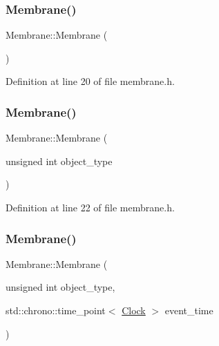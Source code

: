 \subsubsection{\texorpdfstring{Membrane()}{Membrane()}\hspace{0.1cm}{\footnotesize\ttfamily [1/4]}}
{\footnotesize\ttfamily Membrane\+::\+Membrane (\begin{DoxyParamCaption}{ }\end{DoxyParamCaption})\hspace{0.3cm}{\ttfamily [inline]}}



Definition at line 20 of file membrane.\+h.

\mbox{\label{class_membrane_a9e45fcb5a4e791f2697fce4d9fa78a3f}} 
\subsubsection{\texorpdfstring{Membrane()}{Membrane()}\hspace{0.1cm}{\footnotesize\ttfamily [2/4]}}
{\footnotesize\ttfamily Membrane\+::\+Membrane (\begin{DoxyParamCaption}\item[{unsigned int}]{object\+\_\+type }\end{DoxyParamCaption})\hspace{0.3cm}{\ttfamily [inline]}}



Definition at line 22 of file membrane.\+h.

\mbox{\label{class_membrane_afeb8292866a69bdc2b9be6dcd902b519}} 
\subsubsection{\texorpdfstring{Membrane()}{Membrane()}\hspace{0.1cm}{\footnotesize\ttfamily [3/4]}}
{\footnotesize\ttfamily Membrane\+::\+Membrane (\begin{DoxyParamCaption}\item[{unsigned int}]{object\+\_\+type,  }\item[{std\+::chrono\+::time\+\_\+point$<$ \mbox{\hyperlink{universe_8h_a0ef8d951d1ca5ab3cfaf7ab4c7a6fd80}{Clock}} $>$}]{event\+\_\+time }\end{DoxyParamCaption})\hspace{0.3cm}{\ttfamily [inline]}}



